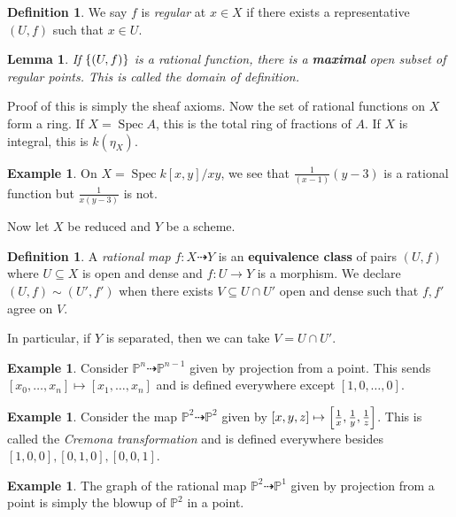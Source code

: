 \documentclass[leqno, openany]{memoir}
\newtheorem{lem}[thm]{Lemma}
\theoremstyle{definition}
\newtheorem{defn}[thm]{Definition}
\newtheorem{exm}[thm]{Example}
\theoremstyle{remark}
\theoremstyle{plain}
\theoremstyle{definition}
\theoremstyle{remark}
\renewcommand{\P}{\mathbb{P}}
\DeclareMathOperator{\Spec}{Spec}
\begin{document}
\begin{defn} We say $f$ is \textit{regular} at $x \in X$ if there exists a
representative $(U, f)$ such that $x \in U$.  \end{defn}

\begin{lem} If $\qty{(U, f)}$ is a rational function, there is a
\textbf{maximal} open subset of regular points. This is called the
\textit{domain of definition}.  \end{lem}

Proof of this is simply the sheaf axioms. Now the set of rational functions on
$X$ form a ring. If $X = \Spec A$, this is the total ring of fractions of $A$.
If $X$ is integral, this is $k(\eta_X)$.

\begin{exm} On $X = \Spec k[x,y]/xy$, we see that $\frac{1}{(x-1)}{(y-3)}$ is a
rational function but $\frac{1}{x(y-3)}$ is not.  \end{exm}

Now let $X$ be reduced and $Y$ be a scheme.  \begin{defn} A \textit{rational
    map} $f \colon X \dashrightarrow Y$ is an \textbf{equivalence class} of
    pairs ${(U, f)}$ where $U \subseteq X$ is open and dense and $f \colon U
    \to Y$ is a morphism. We declare $(U, f) \sim (U', f')$ when there exists
    $V \subseteq U \cap U'$ open and dense such that $f,f'$ agree on $V$.
\end{defn}

In particular, if $Y$ is separated, then we can take $V = U \cap U'$.

\begin{exm} Consider $\P^n \dashrightarrow \P^{n-1}$ given by projection from a
point. This sends $[x_0, \ldots, x_n] \mapsto [x_1, \ldots, x_n]$ and is
defined everywhere except $[1,0,\ldots,0]$.  \end{exm}

\begin{exm} Consider the map $\P^2 \dashrightarrow \P^2$ given by $[x,y,z]
    \mapsto \qty[\frac{1}{x}, \frac{1}{y}, \frac{1}{z}]$. This is called the
    \textit{Cremona transformation} and is defined everywhere besides $[1,0,0],
    [0,1,0], [0,0,1]$.  \end{exm}

\begin{exm} The graph of the rational map $\P^2 \dashrightarrow \P^1$ given by
projection from a point is simply the blowup of $\P^2$ in a point.  \end{exm}
\end{document}
